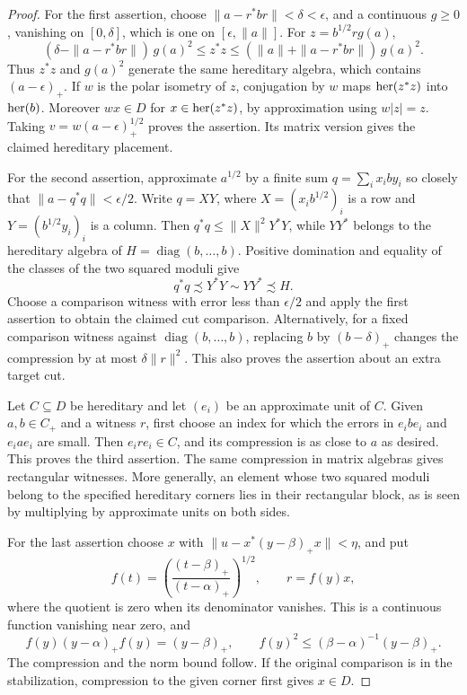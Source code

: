 \begin{proof}
For the first assertion, choose
\(\|a-r^*br\|<\delta<\epsilon\), and a continuous \(g\ge0\), vanishing
on \([0,\delta]\), which is one on \([\epsilon,\|a\|]\).
For \(z=b^{1/2}rg(a)\),
\[
 (\delta-\|a-r^*br\|)\,g(a)^2
 \le z^*z
 \le (\|a\|+\|a-r^*br\|)\,g(a)^2.
\]
Thus \(z^*z\) and \(g(a)^2\) generate the same hereditary algebra,
which contains \((a-\epsilon)_+\). If \(w\) is the polar isometry of
\(z\), conjugation by \(w\) maps \(\operatorname{her}(z^*z)\) into \(\operatorname{her}(b)\).
Moreover \(wx\in D\) for \(x\in\operatorname{her}(z^*z)\), by approximation using
\(w|z|=z\). Taking \(v=w(a-\epsilon)_+^{1/2}\) proves the assertion.
Its matrix version gives the claimed hereditary placement.

For the second assertion, approximate $a^{1/2}$ by a finite sum
$q=\sum_i x_i b y_i$ so closely that $\|a-q^*q\|<\epsilon/2$.
Write $q=XY$, where $X=(x_i b^{1/2})_i$ is a row and
$Y=(b^{1/2}y_i)_i$ is a column. Then
$q^*q\le\|X\|^2Y^*Y$, while $YY^*$ belongs to the hereditary
algebra of $H=\operatorname{diag}(b,\ldots,b)$.
Positive domination and equality of the classes of the two squared
moduli give
\[
 q^*q\precsim Y^*Y\sim YY^*\precsim H.
\]
Choose a comparison witness with error less than $\epsilon/2$ and
apply the first assertion to obtain the claimed cut comparison.
Alternatively, for a fixed comparison witness against
\(\operatorname{diag}(b,\ldots,b)\), replacing \(b\) by
\((b-\delta)_+\) changes the compression by at most
\(\delta\|r\|^2\). This also proves the assertion about an extra target
cut.

Let \(C\subseteq D\) be hereditary and let \((e_i)\) be an approximate
unit of \(C\). Given \(a,b\in C_+\) and a witness \(r\), first choose
an index for which the errors in \(e_i b e_i\) and \(e_i a e_i\) are
small. Then \(e_i r e_i\in C\), and its compression is as close to
\(a\) as desired. This proves the third assertion. The same
compression in matrix algebras gives rectangular witnesses. More
generally, an element whose two squared moduli belong to the
specified hereditary corners lies in their rectangular block, as
is seen by multiplying by approximate units on both sides.

For the last assertion choose \(x\) with
\(\|u-x^*(y-\beta)_+x\|<\eta\), and put
\[
 f(t)=
 \left(\frac{(t-\beta)_+}{(t-\alpha)_+}\right)^{1/2},
 \qquad r=f(y)x,
\]
where the quotient is zero when its denominator vanishes. This is a
continuous function vanishing near zero, and
\[
 f(y)(y-\alpha)_+f(y)=(y-\beta)_+,\qquad
 f(y)^2\le(\beta-\alpha)^{-1}(y-\beta)_+.
\]
The compression and the norm bound follow. If the original
comparison is in the stabilization, compression to the given corner
first gives \(x\in D\).
\end{proof}

